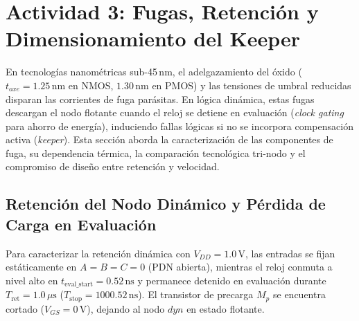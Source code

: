 \section{Actividad 3: Fugas, Retención y Dimensionamiento del Keeper}
\label{sec:actividad3}

En tecnologías nanométricas sub-45\,nm, el adelgazamiento del óxido ($t_{oxe} = 1.25\,\text{nm}$ en NMOS, $1.30\,\text{nm}$ en PMOS) y las tensiones de umbral reducidas disparan las corrientes de fuga parásitas. En lógica dinámica, estas fugas descargan el nodo flotante cuando el reloj se detiene en evaluación (\textit{clock gating} para ahorro de energía), induciendo fallas lógicas si no se incorpora compensación activa (\textit{keeper}). Esta sección aborda la caracterización de las componentes de fuga, su dependencia térmica, la comparación tecnológica tri-nodo y el compromiso de diseño entre retención y velocidad.

\subsection{Retención del Nodo Dinámico y Pérdida de Carga en Evaluación}
Para caracterizar la retención dinámica con $V_{DD} = 1.0\,\text{V}$, las entradas se fijan estáticamente en $A=B=C=0$ (PDN abierta), mientras el reloj conmuta a nivel alto en $t_{\text{eval\_start}} = 0.52\,\text{ns}$ y permanece detenido en evaluación durante $T_{\text{ret}} = 1.0\,\mu\text{s}$ ($T_{\text{stop}} = 1000.52\,\text{ns}$). El transistor de precarga $M_p$ se encuentra cortado ($V_{GS} = 0\,\text{V}$), dejando al nodo $dyn$ en estado flotante.

